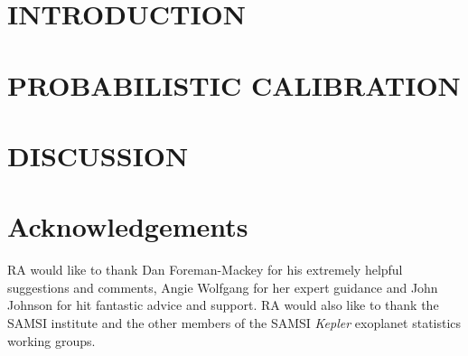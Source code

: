 \documentclass[apjl]{emulateapj}
\begin{document}


\section{INTRODUCTION}
\label{sec:intro}



\section{PROBABILISTIC CALIBRATION}
\label{sec:HBM}



\section{DISCUSSION}
\label{sec:discussion}



\acknowledgements
\section*{Acknowledgements}

RA would like to thank Dan Foreman-Mackey for his extremely helpful suggestions
and comments, Angie Wolfgang for her expert guidance and John Johnson for hit
fantastic advice and support.
RA would also like to thank the SAMSI institute and the other members of the
SAMSI {\it Kepler} exoplanet statistics working groups.

\end{document}
